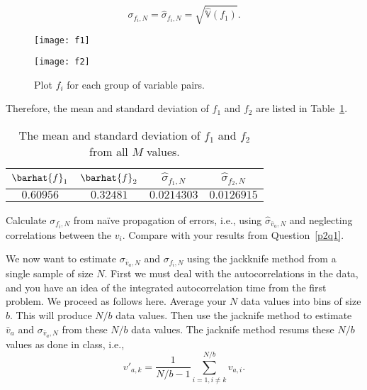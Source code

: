 \begin{equation}
    \sigma_{f_i,N} = \hat{\sigma}_{f_i,N} = \sqrt{\hat{\mathbb{V}}(f_1)}.
\end{equation}

\begin{figure}
    \centering
    \begin{minipage}[t]{0.8\linewidth}
        \centering
        \texttt{[image: f1]}
        \label{fig:fi:a}
    \end{minipage}
    \hfill
    \begin{minipage}[t]{0.8\linewidth}
        \centering
        \texttt{[image: f2]}
        \label{fig:fi:b}
    \end{minipage}
    \caption{Plot \(f_i\) for each group of variable pairs.}
    \label{fig:fi}
\end{figure}

Therefore, the mean and standard deviation of \(f_1\) and
\(f_2\) are listed in Table~\ref{tab:stdf1f2}.

\begin{table}
    \centering
    \caption{The mean and standard deviation of \(f_1\) and \(f_2\) from all \(M\) values.}
    \label{tab:stdf1f2}
    \begin{tabular}{@{}cccc@{}}
        \toprule
        \(\barhat{f}_1\) & \(\barhat{f}_2\) & \(\hat{\sigma}_{f_1,N}\) & \(\hat{\sigma}_{f_2,N}\) \\
        \midrule
        \(0.60956\)      & \(0.32481\)      & \(0.0214303\)            & \(0.0126915\)            \\
        \bottomrule
    \end{tabular}
\end{table}


\Question{} Calculate \(\sigma_{f_i,N}\) from naïve propagation of errors, i.e., using
\(\hat{\sigma}_{\bar{v}_a,N}\) and neglecting correlations between the \(v_i\). Compare with
your results from Question~\ref{p2q1}.

\Answer{}



\Question{} We now want to estimate \(\sigma_{\bar{v}_a,N}\) and \(\sigma_{f_i,N}\) using
the jackknife method from a single sample of size \(N\).
First we must deal with the autocorrelations in the data, and you have an idea of the
integrated autocorrelation time from the first problem. We proceed as follows here. Average
your \(N\) data values into bins of size \(b\). This will produce \(N/b\) data values.
Then use the jacknife method to estimate \(\bar{v}_a\) and \(\sigma_{\bar{v}_a,N}\) from
these \(N/b\) data values. The jacknife method resums these \(N/b\) values as done in class,
i.e.,
%
\begin{equation}
    v'_{a,k} = \frac{ 1 }{ N / b - 1 } \sum_{i=1, i \neq k}^{N/b} v_{a,i}.
\end{equation}

